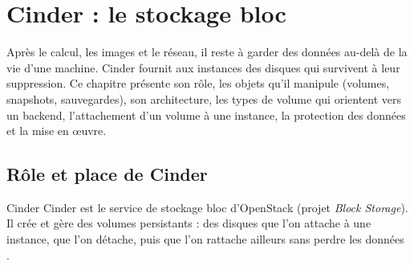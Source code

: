 
\section{Cinder : le stockage bloc}\label{chap:cinder}

Après le calcul, les images et le réseau, il reste à garder des données au-delà de la vie d'une machine. Cinder fournit aux
instances des disques qui survivent à leur suppression. Ce chapitre présente son rôle, les objets qu'il manipule (volumes,
snapshots, sauvegardes), son architecture, les types de volume qui orientent vers un backend, l'attachement d'un volume à une
instance, la protection des données et la mise en œuvre.

\subsection{Rôle et place de Cinder}\label{sec:ci-role}

\begin{definition}{Cinder}
Cinder est le service de stockage bloc d'OpenStack (projet \emph{Block Storage}). Il crée et gère des \glspl{volume}
persistants : des disques que l'on attache à une instance, que l'on détache, puis que l'on rattache ailleurs sans perdre
les données \parencite{cinder-components}.
\end{definition}

